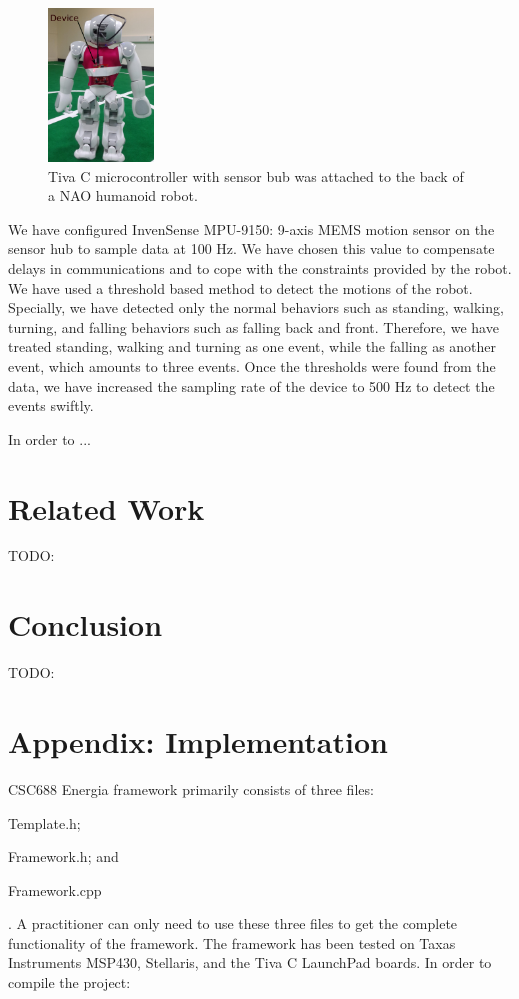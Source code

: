 \documentclass{llncs}
\begin{document}
\begin{sloppy}
\begin{figure}[!ht]
\centering
 \includegraphics[width=0.25\textwidth] {attached_device}
 \caption{Tiva C microcontroller with sensor bub was attached to the back of a NAO humanoid robot.}
 \label{fig:attached_device}
\end{figure}

We have configured InvenSense MPU-9150: 9-axis MEMS motion sensor on the sensor hub to sample data
at 100 Hz. We have chosen this value to compensate delays in communications and to cope with the
constraints provided by the robot. We have used a threshold based method to detect the motions of
the robot. Specially, we have detected only the normal behaviors such as standing, walking, turning,
and falling behaviors such as falling back and front. Therefore, we have treated standing, walking
and turning as one event, while the falling as another event, which amounts to three events. Once
the thresholds were found from the data, we have increased the sampling rate of the device to 500 Hz
to detect the events swiftly.  

In order to ...

\section{Related Work}
TODO:

\section{Conclusion}
TODO:




\section*{Appendix: Implementation}
\label{appendix:Implementation}
CSC688 Energia framework primarily consists of three files: \begin{inparaenum}[(1)] \item
\label{fmw:A} {\sf Template.h}; \item \label{fmw:B} {\sf Framework.h}; and \item \label{fmw:C} {\sf
Framework.cpp}\end{inparaenum}. A practitioner can only need to use these three files to get the
complete functionality of the framework. The framework has been tested on Taxas Instruments MSP430,
Stellaris, and the Tiva C LaunchPad boards. In order to compile the project:


\end{sloppy}
\end{document}
